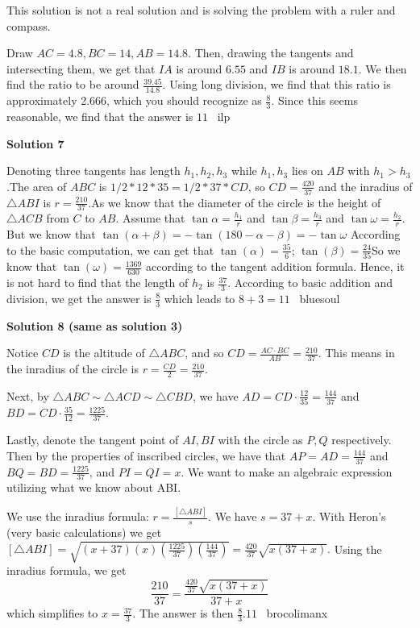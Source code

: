 \begin{enumerate}
This solution is not a real solution and is solving the problem with a ruler and compass.

 Draw $AC = 4.8, BC = 14, AB = 14.8$. Then, drawing the tangents and intersecting them, we get that $IA$ is around $6.55$ and $IB$ is around $18.1$. We then find the ratio to be around $\frac{39.45}{14.8}$. Using long division, we find that this ratio is approximately 2.666, which you should recognize as $\frac{8}{3}$. Since this seems reasonable, we find that the answer is $\boxed{11}$ ~ilp

 



\textbf{Solution 7}

Denoting three tangents has length $h_1,h_2,h_3$ while $h_1,h_3$ lies on $AB$ with $h_1>h_3$.The area of $ABC$ is $1/2*12*35 = 1/2*37*CD$, so $CD=\frac{420}{37}$ and the inradius of $\triangle ABI$ is $r=\frac{210}{37}$.As we know that the diameter of the circle is the height of $\triangle ACB$ from $C$ to $AB$. Assume that $\tan\alpha=\frac{h_1}{r}$ and $\tan\beta=\frac{h_3}{r}$ and $\tan\omega=\frac{h_2}{r}$. But we know that $\tan(\alpha+\beta)=-\tan(180-\alpha-\beta)=-\tan\omega$ According to the basic computation, we can get that $\tan(\alpha)=\frac{35}{6}$; $\tan(\beta)=\frac{24}{35}$So we know that $\tan(\omega)=\frac{1369}{630}$ according to the tangent addition formula. Hence, it is not hard to find that the length of $h_2$ is $\frac{37}{3}$. According to basic addition and division, we get the answer is $\frac{8}{3}$ which leads to $8+3=\boxed{11}$ ~bluesoul

 



\textbf{Solution 8 (same as solution 3)}

Notice $CD$ is the altitude of $\triangle ABC$, and so $CD = \frac{AC \cdot BC}{AB} = \frac{210}{37}.$ This means in the inradius of the circle is $r=\frac{CD}{2}=\frac{210}{37}.$

 Next, by $\triangle ABC \sim \triangle ACD \sim \triangle CBD$, we have $AD=CD \cdot \frac{12}{35} = \frac{144}{37}$ and $BD = CD \cdot \frac{35}{12} = \frac{1225}{37}$. 

 Lastly, denote the tangent point of $AI, BI$ with the circle as $P, Q$ respectively. Then by the properties of inscribed circles, we have that $AP=AD=\frac{144}{37}$ and $BQ=BD=\frac{1225}{37}$, and $PI=QI=x$. We want to make an algebraic expression utilizing what we know about ABI. 

 We use the inradius formula: $r = \frac{[\triangle ABI]}{s}$. We have $s=37+x$. With Heron's (very basic calculations) we get $[\triangle ABI] = \sqrt{(x+37)(x)(\frac{1225}{37})(\frac{144}{37})} = \frac{420}{37} \sqrt{x(37+x)}.$ Using the inradius formula, we get 
 \[\frac{210}{37} = \frac{\frac{420}{37} \sqrt{x(37+x)}}{37+x}\] which simplifies to $x=\frac{37}{3}$. The answer is then $\frac{8}{3}. \boxed{11}$~ brocolimanx


\end{enumerate}
